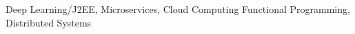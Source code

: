 \small{Deep Learning/J2EE, Microservices, Cloud Computing Functional
Programming, Distributed Systems}
